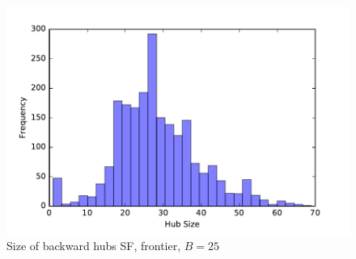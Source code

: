 \begin{figure} 
\begin{center}
\includegraphics[scale=0.5]{TexImg/SF_bwd_hub_size.pdf}
\end{center}
\caption{Size of backward hubs SF, frontier, $B=25$}\label{fig:SF_bwd_size}
\end{figure}

